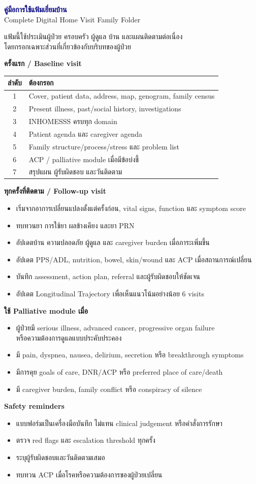 \documentclass[12pt,a4paper]{article}
\newcommand{\st}[1]{\vspace{4pt}\begin{tcolorbox}[colback=navy,colframe=navy,boxrule=0pt,arc=1pt,left=5pt,right=5pt,top=3pt,bottom=3pt]\color{white}\large\textbf{#1}\end{tcolorbox}}
\begin{document}
\begin{center}{\Huge\textcolor{navy}{\textbf{คู่มือการใช้แฟ้มเยี่ยมบ้าน}}}\\[3pt]{\Large Complete Digital Home Visit Family Folder}\end{center}
แฟ้มนี้ใช้ประเมินผู้ป่วย ครอบครัว ผู้ดูแล บ้าน และแผนติดตามต่อเนื่อง\\ โดยกรอกเฉพาะส่วนที่เกี่ยวข้องกับบริบทของผู้ป่วย
\st{ครั้งแรก / Baseline visit}
\begin{tabularx}{\textwidth}{|c|X|}\hline\rowcolor{navy}\color{white}ลำดับ&\color{white}ต้องกรอก\\\hline 1&Cover, patient data, address, map, genogram, family census\\\hline 2&Present illness, past/social history, investigations\\\hline 3&INHOMESSS ครบทุก domain\\\hline 4&Patient agenda และ caregiver agenda\\\hline 5&Family structure/process/stress และ problem list\\\hline 6&ACP / palliative module เมื่อมีข้อบ่งชี้\\\hline 7&สรุปแผน ผู้รับผิดชอบ และวันติดตาม\\\hline\end{tabularx}
\st{ทุกครั้งที่ติดตาม / Follow-up visit}
\begin{itemize}\item เริ่มจากอาการเปลี่ยนแปลงตั้งแต่ครั้งก่อน, vital signs, function และ symptom score\item ทบทวนยา การใช้ยา ผลข้างเคียง และยา PRN\item อัปเดตบ้าน ความปลอดภัย ผู้ดูแล และ caregiver burden เมื่อภาระเพิ่มขึ้น\item อัปเดต PPS/ADL, nutrition, bowel, skin/wound และ ACP เมื่อสถานการณ์เปลี่ยน\item บันทึก assessment, action plan, referral และผู้รับผิดชอบให้ชัดเจน\item อัปเดต Longitudinal Trajectory เพื่อเห็นแนวโน้มอย่างน้อย 6 visits\end{itemize}
\st{ใช้ Palliative module เมื่อ}
\begin{itemize}\item ผู้ป่วยมี serious illness, advanced cancer, progressive organ failure\\ หรือความต้องการดูแลแบบประคับประคอง\item มี pain, dyspnea, nausea, delirium, secretion หรือ breakthrough symptoms\item มีการคุย goals of care, DNR/ACP หรือ preferred place of care/death\item มี caregiver burden, family conflict หรือ conspiracy of silence\end{itemize}
\st{Safety reminders}
\begin{itemize}\item แบบฟอร์มเป็นเครื่องมือบันทึก ไม่แทน clinical judgement หรือคำสั่งการรักษา\item ตรวจ red flags และ escalation threshold ทุกครั้ง\item ระบุผู้รับผิดชอบและวันติดตามเสมอ\item ทบทวน ACP เมื่อโรคหรือความต้องการของผู้ป่วยเปลี่ยน\end{itemize}
\end{document}
